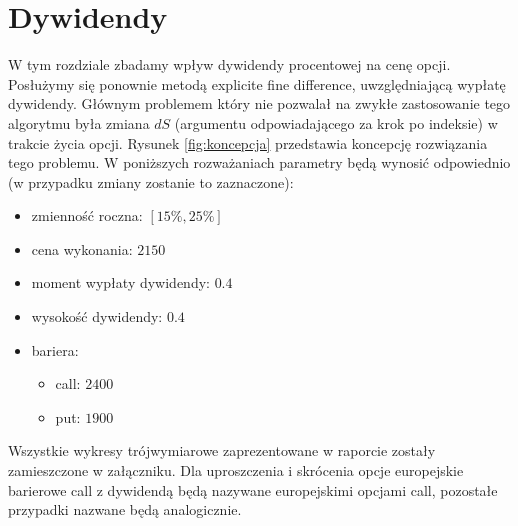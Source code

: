 \documentclass[12pt]{article}
\begin{document}
\section{Dywidendy}
W tym rozdziale zbadamy wpływ dywidendy procentowej na cenę opcji. Posłużymy się ponownie metodą explicite fine difference, uwzględniającą wypłatę dywidendy. Głównym problemem który nie pozwalał na zwykłe zastosowanie tego algorytmu była zmiana $dS$ (argumentu odpowiadającego za krok po indeksie) w trakcie życia opcji. Rysunek \ref{fig:koncepcja} przedstawia koncepcję rozwiązania tego problemu. 
W poniższych rozważaniach parametry będą wynosić odpowiednio (w przypadku zmiany zostanie to zaznaczone):
\begin{itemize}
    \item zmienność roczna: $[15\%, 25\%]$
    \item cena wykonania: $2150$
    \item moment wypłaty dywidendy: $0.4$
    \item wysokość dywidendy: $0.4$
    \item bariera:
    \begin{itemize}
        \item call: $2400$
        \item put: $1900$
    \end{itemize}
    
\end{itemize}
Wszystkie wykresy trójwymiarowe zaprezentowane w raporcie zostały zamieszczone w załączniku. Dla uproszczenia i skrócenia opcje europejskie barierowe call z dywidendą będą nazywane europejskimi opcjami call, pozostałe przypadki nazwane będą analogicznie.
\end{document}
